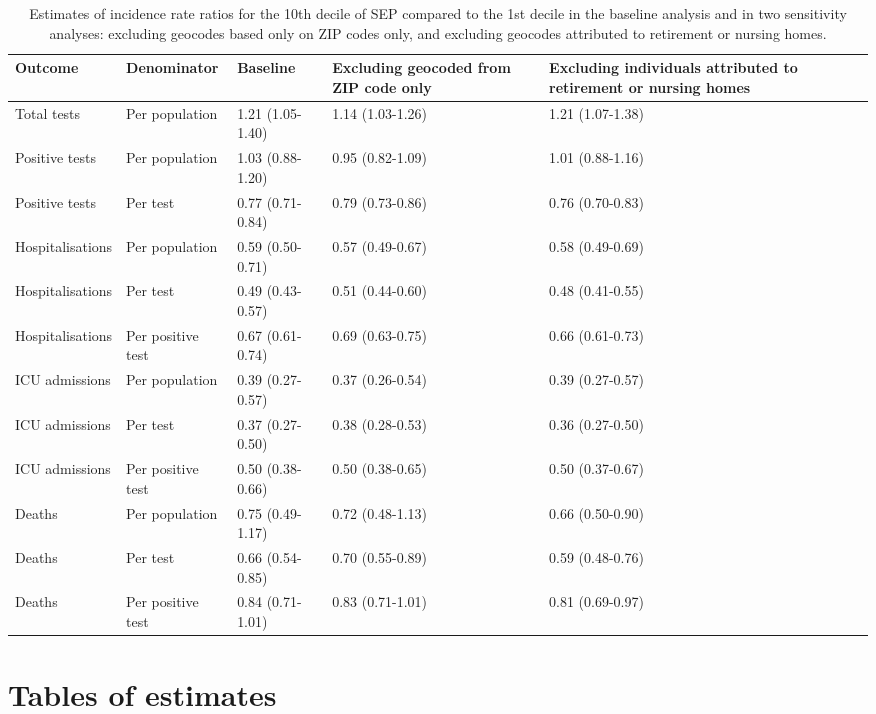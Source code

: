 \documentclass{article}
\begin{document}
\begin{table}[ht]
	\caption{Estimates of incidence rate ratios for the 10th decile of SEP compared to the 1st decile in the baseline analysis and in two sensitivity analyses: excluding geocodes based only on ZIP codes only, and excluding geocodes attributed to retirement or nursing homes.}
	\label{tab:sst2}
	\centering
	\begin{tabular}{llp{3cm}p{3cm}p{3cm}}
		\hline
		Outcome & Denominator & Baseline & Excluding geocoded from ZIP code only & Excluding individuals attributed to retirement or nursing homes \\ 
		\hline
		Total tests & Per population & 1.21 (1.05-1.40) & 1.14 (1.03-1.26) & 1.21 (1.07-1.38) \\ 
		Positive tests & Per population & 1.03 (0.88-1.20) & 0.95 (0.82-1.09) & 1.01 (0.88-1.16) \\ 
		Positive tests & Per test & 0.77 (0.71-0.84) & 0.79 (0.73-0.86) & 0.76 (0.70-0.83) \\ 
		Hospitalisations & Per population & 0.59 (0.50-0.71) & 0.57 (0.49-0.67) & 0.58 (0.49-0.69) \\ 
		Hospitalisations & Per test & 0.49 (0.43-0.57) & 0.51 (0.44-0.60) & 0.48 (0.41-0.55) \\ 
		Hospitalisations & Per positive test & 0.67 (0.61-0.74) & 0.69 (0.63-0.75) & 0.66 (0.61-0.73) \\ 
		ICU admissions & Per population & 0.39 (0.27-0.57) & 0.37 (0.26-0.54) & 0.39 (0.27-0.57) \\ 
		ICU admissions & Per test & 0.37 (0.27-0.50) & 0.38 (0.28-0.53) & 0.36 (0.27-0.50) \\ 
		ICU admissions & Per positive test & 0.50 (0.38-0.66) & 0.50 (0.38-0.65) & 0.50 (0.37-0.67) \\ 
		Deaths & Per population & 0.75 (0.49-1.17) & 0.72 (0.48-1.13) & 0.66 (0.50-0.90) \\ 
		Deaths & Per test & 0.66 (0.54-0.85) & 0.70 (0.55-0.89) & 0.59 (0.48-0.76) \\ 
		Deaths & Per positive test & 0.84 (0.71-1.01) & 0.83 (0.71-1.01) & 0.81 (0.69-0.97) \\
		\hline
	\end{tabular}
\end{table}

	
	\clearpage
	\section{Tables of estimates}
	
\end{document}
